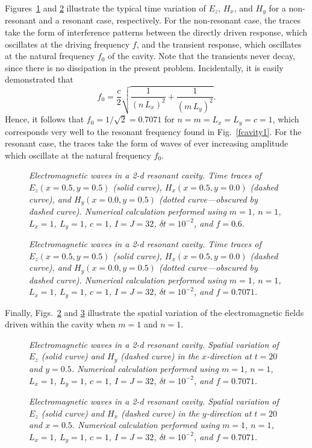 Figures~\ref{fcavity2} and \ref{fcavity3} illustrate the typical time variation
of $E_z$, $H_x$, and $H_y$ for a non-resonant and a resonant case, respectively.
For the non-resonant case, the traces take the form of interference patterns
between the directly driven response, which oscillates at the driving frequency $f$,
and the transient response, which oscillates at the natural frequency $f_0$ of the cavity.
Note that the transients never decay, since there is no dissipation in the present problem.
Incidentally, it is easily demonstrated that
\begin{equation}
f_0 = \frac{c}{2}\sqrt{\frac{1}{(n\,L_x)^2}+\frac{1}{(m\,L_y)^2}}.
\end{equation}
Hence, it follows that $f_0=1/\sqrt{2} = 0.7071$ for $n=m=L_x=L_y=c=1$, which corresponds very well
to the resonant frequency found in Fig.~\ref{fcavity1}.
For the resonant case, the traces take the form of waves of ever increasing amplitude 
which  oscillate at the
natural frequency $f_0$.

\begin{figure}
\epsfysize=3in
\centerline{}
\caption{\em Electromagnetic waves in a 2-d resonant cavity.
Time traces of $E_z(x=0.5,y=0.5)$ (solid curve), $H_x(x=0.5,y=0.0)$ (dashed curve), and
$H_y(x=0.0,y=0.5)$ (dotted curve---obscured by dashed curve).
Numerical calculation performed using $m=1$, $n=1$, $L_x=1$, $L_y=1$, $c=1$,
$I=J=32$, $\delta t = 10^{-2}$, and $f=0.6$.}\label{fcavity2}
\end{figure}

\begin{figure}
\epsfysize=3in
\centerline{}
\caption{\em Electromagnetic waves in a 2-d resonant cavity.
Time traces of $E_z(x=0.5,y=0.5)$ (solid curve), $H_x(x=0.5,y=0.0)$ (dashed curve), and
$H_y(x=0.0,y=0.5)$ (dotted curve---obscured by dashed curve).
Numerical calculation performed using $m=1$, $n=1$, $L_x=1$, $L_y=1$, $c=1$,
$I=J=32$, $\delta t = 10^{-2}$, and $f=0.7071$.}\label{fcavity3}
\end{figure}

Finally, Figs.~\ref{fcavity3} and \ref{fcavity4} illustrate the spatial
variation of the electromagnetic fields driven within the cavity when
$m=1$ and $n=1$. 

\begin{figure}
\epsfysize=3in
\centerline{}
\caption{\em Electromagnetic waves in a 2-d resonant cavity.
Spatial variation of $E_z$ (solid curve) and
$H_y$ (dashed curve) in the $x$-direction at $t=20$ and $y=0.5$.
Numerical calculation performed using $m=1$, $n=1$, $L_x=1$, $L_y=1$, $c=1$,
$I=J=32$, $\delta t = 10^{-2}$, and $f=0.7071$.}\label{fcavity4}
\end{figure}

\begin{figure}
\epsfysize=3in
\centerline{}
\caption{\em Electromagnetic waves in a 2-d resonant cavity.
Spatial variation of $E_z$ (solid curve) and
$H_x$ (dashed curve) in the $y$-direction at $t=20$ and $x=0.5$.
Numerical calculation performed using $m=1$, $n=1$, $L_x=1$, $L_y=1$, $c=1$,
$I=J=32$, $\delta t = 10^{-2}$, and $f=0.7071$.}\label{fcavity5}
\end{figure}
